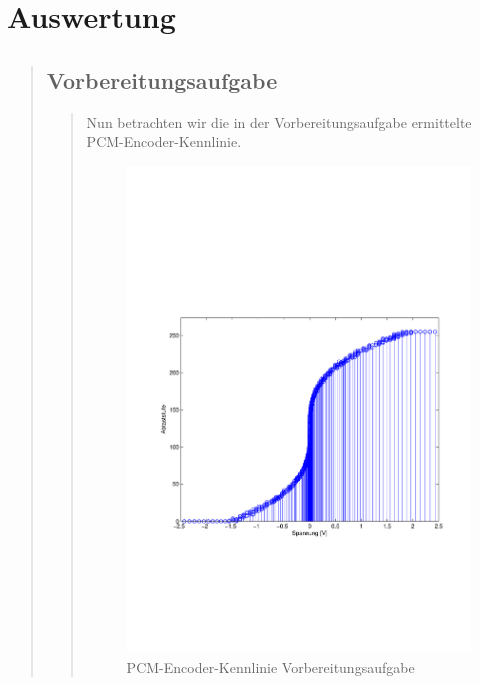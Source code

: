 \section{Auswertung}
\begin{quote}
    
    \subsection{Vorbereitungsaufgabe}
    \begin{quote}
        Nun betrachten wir die in der Vorbereitungsaufgabe ermittelte PCM-Encoder-Kennlinie.
        
        \begin{figure}[H]
        \centering
        \includegraphics[scale=0.7, trim = 2cm 7cm 1cm 9cm, clip]{./Bilder/Kennlinie_Vorbereitungsaufgabe}
            \caption{PCM-Encoder-Kennlinie Vorbereitungsaufgabe}
        \end{figure}
        

\end{quote}
\end{quote}
